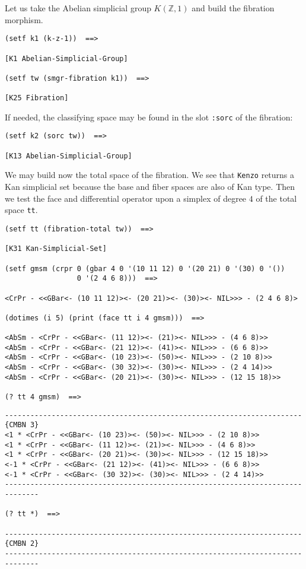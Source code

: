 Let us take the Abelian simplicial group $K(\mathbb{Z},1)$ and  build the fibration morphism.
{\footnotesize\begin{verbatim}
(setf k1 (k-z-1))  ==>

[K1 Abelian-Simplicial-Group]

(setf tw (smgr-fibration k1))  ==>

[K25 Fibration]
\end{verbatim}}
If needed, the classifying space may be found in the slot {\tt :sorc} of the fibration:
{\footnotesize\begin{verbatim}
(setf k2 (sorc tw))  ==>

[K13 Abelian-Simplicial-Group]
\end{verbatim}}
We may build now the total space of the fibration. We see that {\tt Kenzo} returns
a Kan simplicial set because the base and fiber spaces are also of
Kan type. Then we test the face and differential operator upon a simplex of degree $4$ of
the total space {\tt tt}.
{\footnotesize\begin{verbatim}
(setf tt (fibration-total tw))  ==>

[K31 Kan-Simplicial-Set]

(setf gmsm (crpr 0 (gbar 4 0 '(10 11 12) 0 '(20 21) 0 '(30) 0 '())
                 0 '(2 4 6 8)))  ==>

<CrPr - <<GBar<- (10 11 12)><- (20 21)><- (30)><- NIL>>> - (2 4 6 8)>

(dotimes (i 5) (print (face tt i 4 gmsm)))  ==>

<AbSm - <CrPr - <<GBar<- (11 12)><- (21)><- NIL>>> - (4 6 8)>>
<AbSm - <CrPr - <<GBar<- (21 12)><- (41)><- NIL>>> - (6 6 8)>>
<AbSm - <CrPr - <<GBar<- (10 23)><- (50)><- NIL>>> - (2 10 8)>>
<AbSm - <CrPr - <<GBar<- (30 32)><- (30)><- NIL>>> - (2 4 14)>>
<AbSm - <CrPr - <<GBar<- (20 21)><- (30)><- NIL>>> - (12 15 18)>>

(? tt 4 gmsm)  ==>
\end{verbatim}}
\newpage
{\footnotesize\begin{verbatim}
----------------------------------------------------------------------{CMBN 3}
<1 * <CrPr - <<GBar<- (10 23)><- (50)><- NIL>>> - (2 10 8)>>
<1 * <CrPr - <<GBar<- (11 12)><- (21)><- NIL>>> - (4 6 8)>>
<1 * <CrPr - <<GBar<- (20 21)><- (30)><- NIL>>> - (12 15 18)>>
<-1 * <CrPr - <<GBar<- (21 12)><- (41)><- NIL>>> - (6 6 8)>>
<-1 * <CrPr - <<GBar<- (30 32)><- (30)><- NIL>>> - (2 4 14)>>
------------------------------------------------------------------------------

(? tt *)  ==>

----------------------------------------------------------------------{CMBN 2}
------------------------------------------------------------------------------
\end{verbatim}}

